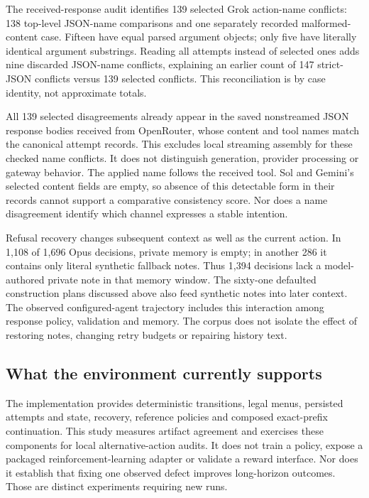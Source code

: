 The received-response audit identifies 139 selected Grok action-name conflicts: 138 top-level JSON-name comparisons and one separately recorded malformed-content case. Fifteen have equal parsed argument objects; only five have literally identical argument substrings. Reading all attempts instead of selected ones adds nine discarded JSON-name conflicts, explaining an earlier count of 147 strict-JSON conflicts versus 139 selected conflicts. This reconciliation is by case identity, not approximate totals.

All 139 selected disagreements already appear in the saved nonstreamed JSON response bodies received from OpenRouter, whose content and tool names match the canonical attempt records. This excludes local streaming assembly for these checked name conflicts. It does not distinguish generation, provider processing or gateway behavior. The applied name follows the received tool. Sol and Gemini's selected content fields are empty, so absence of this detectable form in their records cannot support a comparative consistency score. Nor does a name disagreement identify which channel expresses a stable intention.

Refusal recovery changes subsequent context as well as the current action. In 1,108 of 1,696 Opus decisions, private memory is empty; in another 286 it contains only literal synthetic fallback notes. Thus 1,394 decisions lack a model-authored private note in that memory window. The sixty-one defaulted construction plans discussed above also feed synthetic notes into later context. The observed configured-agent trajectory includes this interaction among response policy, validation and memory. The corpus does not isolate the effect of restoring notes, changing retry budgets or repairing history text.



\subsection{What the environment currently supports}

The implementation provides deterministic transitions, legal menus, persisted attempts and state, recovery, reference policies and composed exact-prefix continuation. This study measures artifact agreement and exercises these components for local alternative-action audits. It does not train a policy, expose a packaged reinforcement-learning adapter or validate a reward interface. Nor does it establish that fixing one observed defect improves long-horizon outcomes. Those are distinct experiments requiring new runs.

